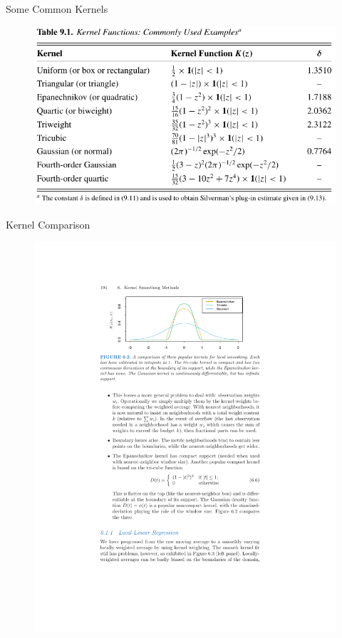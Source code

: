 \documentclass[11pt, aspectratio=169]{beamer}
\begin{document}
\begin{frame}{Some Common Kernels}
  \begin{figure}[htbp]
  \begin{center}
  \includegraphics[scale=0.7]{./resources/CTKernels}
  \label{fig:kernels}
  \end{center}
  \end{figure}
\end{frame}
  
\begin{frame}{Kernel Comparison}
  \begin{figure}[htbp]
  \begin{center}
  \includegraphics[width=\textwidth]{./resources/kernelfig.pdf}
  \label{kernelfig}
  \end{center}
  \end{figure}
\end{frame}
\end{document}
